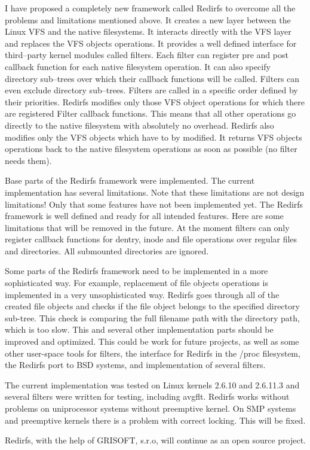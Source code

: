 I have proposed a completely new framework called Redirfs to overcome all the problems
and limitations mentioned above. It creates a new layer between the Linux VFS and the
native filesystems. It interacts directly with the VFS layer and replaces the VFS
objects operations. It provides a well defined interface for third--party kernel
modules called filters. Each filter can register pre and post callback function for
each native filesystem operation. It can also specify directory sub--trees over which
their callback functions will be called. Filters can even exclude directory sub--trees.
Filters are called in a specific order defined by their priorities. Redirfs modifies
only those VFS object operations for which there are registered Filter callback
functions. This means that all other operations go directly to the native filesystem
with absolutely no overhead. Redirfs also modifies only the VFS objects which have to
by modified. It returns VFS objects operations back to the native filesystem
operations as soon as possible (no filter needs them).

Base parts of the Redirfs framework were implemented. The current implementation has
several limitations. Note that these limitations are not design limitations! Only that
some features have not been implemented yet. The Redirfs framework is well defined and
ready for all intended features. Here are some limitations that will be removed in the
future. At the moment filters can only register callback functions for dentry, inode
and file operations over regular files and directories. All submounted directories are
ignored.

Some parts of the Redirfs framework need to be implemented in a more sophisticated
way. For example, replacement of file objects operations is implemented in a very
unsophisticated way.
Redirfs goes through all of the created file objects and checks if the file object
belongs to the specified directory sub-tree. This check is comparing the full filename
path with the directory path, which is too slow. This and several other implementation
parts should be improved and optimized. This could be work for future projects, as
well as some other user-space tools for filters, the interface for Redirfs in the
/proc filesystem, the Redirfs port to BSD systems, and implementation of several
filters.

The current implementation was tested on Linux kernels 2.6.10 and 2.6.11.3 and several
filters were written for testing, including avgflt. Redirfs works without problems on
uniprocessor systems without preemptive kernel. On SMP systems and preemptive kernels
there is a problem with correct locking. This will be fixed.

Redirfs, with the help of GRISOFT, s.r.o, will continue as an open source project.
